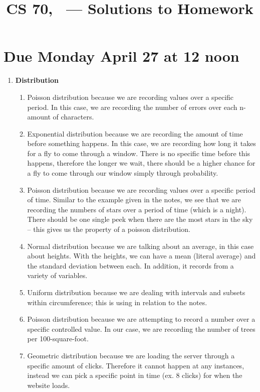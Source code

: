 \documentclass[12pt,fleqn]{article}
\title{CS 70, \Session\ --- Solutions to Homework \Homework}
\date{}
\begin{document}
\maketitle

\section*{Due Monday April 27 at 12 noon}



\begin{enumerate}
  \item \textbf{Distribution}
  
    \begin{enumerate}
      \item 
		Poisson distribution because we are recording values over a specific period. In this case, we are recording the number of errors over each n-amount of characters. 
	  \item 
	  	Exponential distribution because we are recording the amount of time before something happens. In this case, we are recording how long it takes for a fly to come through a window. There is no specific time before this happens, therefore the longer we wait, there should be a higher chance for a fly to come through our window simply through probability. 
	  \item
	  	Poisson distribution because we are recording values over a specific period of time. Similar to the example given in the notes, we see that we are recording the numbers of stars over a period of time (which is a night). There should be one single peek when there are the most stars in the sky -- this gives us the property of a poisson distribution.
	  \item
	  	Normal distribution because we are talking about an average, in this case about heights. With the heights, we can have a mean (literal average) and the standard deviation between each. In addition, it records from a variety of variables.
	  \item 
	  	Uniform distribution because we are dealing with intervals and subsets within circumference; this is using in relation to the notes. 
	  \item 
	  	Poisson distribution because we are attempting to record a number over a specific controlled value. In our case, we are recording the number of trees per 100-square-foot. 
	  \item 
	  	Geometric distribution because we are loading the server through a specific amount of clicks. Therefore it cannot happen at any instances, instead we can pick a specific point in time (ex. 8 clicks) for when the website loads. 

\end{enumerate}
\end{enumerate}
\end{document}
